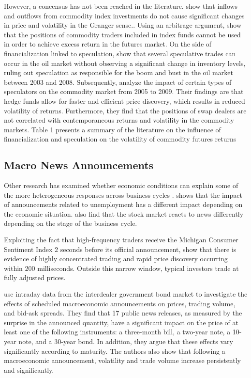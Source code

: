 \documentclass[12pt]{article}
\begin{document}
However, a concensus has not been reached in the literature.  \citet{stoll2010commodity}  show that inflows and outflows from commodity index investments do not cause significant changes in price and volatility in the Granger sense.. Using an arbitrage argument, \citet{hamilton2014risk} show that the positions of commodity traders included in index funds cannot be used in order to achieve excess return in the futures market. On the side of financialization linked to speculation,  \citet{kilian2014role}  show that several speculative trades can occur in the oil market without observing a significant change in inventory levels, ruling out speculation as responsible for the boom and bust in the oil market between 2003 and 2008. Subsequently,  \citet{brunetti2016speculators}  analyze the impact of certain types of speculators on the commodity market from 2005 to 2009. Their findings are that hedge funds allow for faster and efficient price discovery, which results in reduced volatility of returns. Furthermore, they find that the positions of swap dealers are not correlated with contemporaneous returns and volatility in the commodity markets.  Table 1 presents a summary of the literature on the influence of financialization and speculation on the volatility of commodity futures returns

\subsection{Macro News Announcements}

Other research has examined whether economic conditions can explain some of the more heterogeneous responses across business cycles \citep{boyd2005stock,andersen2003micro}. \citet{boyd2005stock} shows that the impact of announcements related to unemployment has a different impact depending on the economic situation. \citet{andersen2003micro} also find that the stock market reacts to news differently depending on the stage of the business cycle.

Exploiting the fact that high-frequency traders receive the Michigan Consumer Sentiment Index 2 seconds before its official announcement, \citet{hu2017early} show that there is evidence of highly concentrated trading and rapid price discovery occurring within 200 milliseconds. Outside this narrow window, typical investors trade at fully adjusted prices. 

\citet{balduzzi2001economic}  use intraday data from the interdealer government bond market to investigate the effects of scheduled macroeconomic announcements on prices, trading volume, and bid-ask spreads. They find that 17 public news releases, as measured by the surprise in the announced quantity, have a significant impact on the price of at least one of the following instruments: a three-month bill, a two-year note, a 10-year note, and a 30-year bond. In addition, they argue that these effects vary significantly according to maturity. The authors also show that following a macroeconomic announcement, volatility and trade volume increase persistently and significantly.
\end{document}
